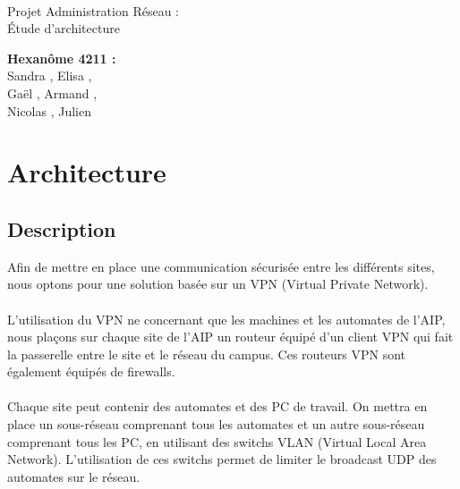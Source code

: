 \documentclass[a4paper]{article}
\begin{document}
\begin{titlepage}
	~ 
	\vfill
	\begin{center}
		\begin{Huge}
			Projet Administration Réseau : \\ Étude d'architecture\\
		\end{Huge}
	\vfill
		\textbf{Hexanôme 4211 :} 
			\\Sandra {}, Elisa , 
			\\Gaël , Armand , 
			\\Nicolas {}, Julien \\
	\vfill
	\end{center}
	\vfill
\end{titlepage}

\newpage

\section{Architecture}

	\subsection{Description} %
	
	Afin de mettre en place une communication sécurisée entre les différents sites, nous optons pour une solution basée sur un VPN (Virtual Private Network). 
	
	\paragraph*{} %
	L'utilisation du VPN ne concernant que les machines et les automates de l'AIP, nous plaçons sur chaque site de l'AIP un routeur équipé d'un client VPN qui fait la passerelle entre le site et le réseau du campus. Ces routeurs VPN sont également équipés de firewalls. 
	
	\paragraph*{} %
	Chaque site peut contenir des automates et des PC de travail. On mettra en place un sous-réseau comprenant tous les automates et un autre sous-réseau comprenant tous les PC, en utilisant des switchs VLAN (Virtual Local Area Network). L'utilisation de ces switchs permet de limiter le broadcast UDP des automates sur le réseau. 
	
\end{document}
